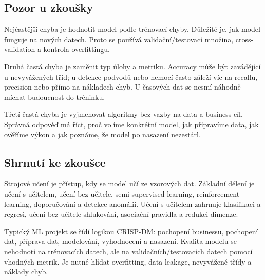 \subsection{Pozor u zkoušky}

Nejčastější chyba je hodnotit model podle trénovací chyby. Důležité je, jak model funguje na nových
datech. Proto se používá validační/testovací množina, cross-validation a kontrola overfittingu.

Druhá častá chyba je zaměnit typ úlohy a metriku. Accuracy může být zavádějící u nevyvážených tříd; u
detekce podvodů nebo nemocí často záleží víc na recallu, precision nebo přímo na nákladech chyb. U
časových dat se nesmí náhodně míchat budoucnost do tréninku.

Třetí častá chyba je vyjmenovat algoritmy bez vazby na data a business cíl. Správná odpověď má říct, proč
volíme konkrétní model, jak připravíme data, jak ověříme výkon a jak poznáme, že model po nasazení
nezestárl.

\subsection{Shrnutí ke zkoušce}

Strojové učení je přístup, kdy se model učí ze vzorových dat. Základní dělení je učení s učitelem,
učení bez učitele, semi-supervised learning, reinforcement learning, doporučování a detekce anomálií.
Učení s učitelem zahrnuje klasifikaci a regresi, učení bez učitele shlukování, asociační pravidla a
redukci dimenze.

Typický ML projekt se řídí logikou CRISP-DM: pochopení businessu, pochopení dat, příprava dat, modelování,
vyhodnocení a nasazení. Kvalita modelu se nehodnotí na trénovacích datech, ale na validačních/testovacích
datech pomocí vhodných metrik. Je nutné hlídat overfitting, data leakage, nevyvážené třídy a náklady chyb.

